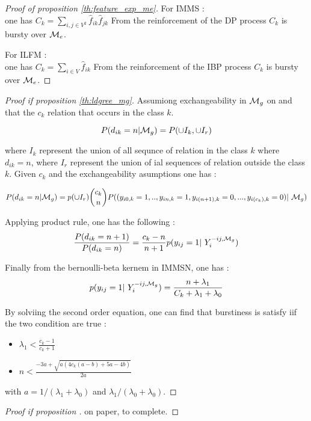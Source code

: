 \begin{proof}[Proof of proposition \ref{th:feature_exp_me}]

For IMMS : ~\\

one has $C_k = \sum_{i,j \in V^2} \hat f_{ik} \hat f_{jk}$
From the reinforcement of the DP process $C_k$ is bursty over $\mathcal{M}_e$.

For ILFM : ~\\

one has $C_k = \sum_{i \in V} \hat f_{ik}$
From the reinforcement of the IBP process $C_k$ is bursty over $\mathcal{M}_e$.
\end{proof}

\begin{proof}[Proof if proposition \ref{th:ldgree_mg}]
Assumiong exchangeability in  $\mathcal{M}_g$ on and that the $c_k$ relation that occurs in the class $k$.

\begin{equation}
P(d_{ik}=n | \mathcal{M}_g) = P( \cup I_k, \cup I_r)
\end{equation}

where $I_k$ represent the union of all sequnce of relation in the class $k$ where $d_{ik} = n$, where $I_r$ represent the union of ial sequences of relation outside the class $k$. Given $c_k$ and the exchangeability asumptions one has : 

\begin{equation}
P(d_{ik}=n | \M_g) = p(\cup I_r) \dbinom{c_k}{n} P( (y_{i0, k}=1,..,  y_{in, k}=1, y_{i(n+1), k}=0,...,y_{i(c_k), k}=0) | \M_g)
\end{equation}

Applying product rule, one has the following : 
\begin{equation}
\frac{P(d_{ik} = n+1)}{P(d_{ik} = n)} = \frac{c_k - n}{n+1} p(y_{ij}=1 | Y_i^{-ij, \M_g})
\end{equation}

Finally from the bernoulli-beta kernem in IMMSN, one has : 
\begin{equation}
p(y_{ij}=1 | Y_i^{-ij, \M_g}) = \frac{n+ \lambda_1}{C_k + \lambda_1 + \lambda_0}
\end{equation}

By solviing the second order equation, one can find that burstiness is satisfy iif the two condition are true : 
\begin{itemize}
\item $ \lambda_1 < \frac{c_k-1}{c_k+1}$
\item $ n < \frac{-3a + \sqrt{a(4c_k(a-b)+5a-4b)}}{2a}$
\end{itemize}
with $a = 1/(\lambda_1+\lambda_0)$ and $\lambda_1 / (\lambda_0+\lambda_0)$.

\end{proof}


\begin{proof}[Proof if proposition \label{th:feature_mg}]
on paper, to complete.
\end{proof}

